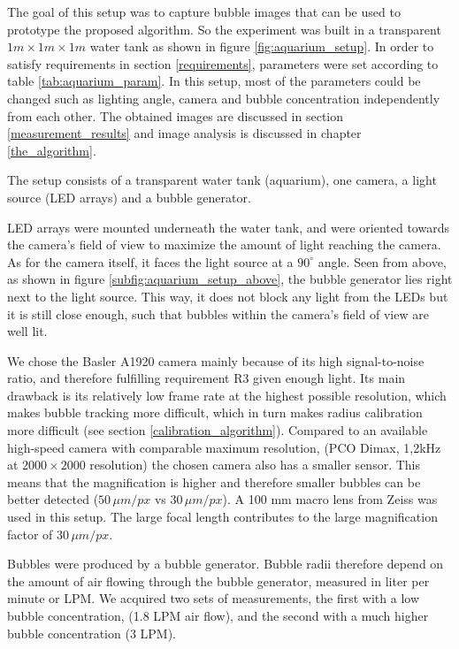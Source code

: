 		The goal of this setup was to capture bubble images that can be used to prototype the proposed algorithm. So the experiment was built in a transparent $1m \times 1m \times 1m$ water tank as shown in figure \ref{fig:aquarium_setup}. In order to satisfy requirements in section \ref{requirements}, parameters were set according to table \ref{tab:aquarium_param}. 
		 In this setup, most of the parameters could be changed such as lighting angle, camera and bubble concentration independently from each other. The obtained images are discussed in section \ref{measurement_results} and image analysis is discussed in chapter \ref{the_algorithm}.
		 
		 The setup consists of a transparent water tank (aquarium), one camera, a light source (LED arrays) and a bubble generator. 
		 
		 LED arrays were mounted underneath the water tank, and were oriented towards the camera's field of view to maximize the amount of light reaching the camera. As for the camera itself, it faces the light source at a $90^\circ$ angle. 
		 Seen from above, as shown in figure \ref{subfig:aquarium_setup_above}, the bubble generator lies right next to the light source. This way, it does not block any light from the LEDs but it is still close enough, such that bubbles within the camera's field of view are well lit. 
		
		We chose the Basler A1920 camera mainly because of its high signal-to-noise ratio, and therefore fulfilling requirement R3 given enough light. Its main drawback is its relatively low frame rate at the highest possible resolution, which makes bubble tracking more difficult, which in turn makes radius calibration more difficult (see section \ref{calibration_algorithm}). Compared to an available high-speed camera with comparable maximum resolution, (PCO Dimax, 1,2kHz at $2000 \times 2000$ resolution) the chosen camera also has a smaller sensor. This means that the magnification is higher and therefore smaller bubbles can be better detected ($50 \, \mu m/px$ vs $30 \, \mu m /px$). A 100 mm macro lens from Zeiss was used in this setup. The large focal length contributes to the large magnification factor of $30 \, \mu m /px$.
	
	Bubbles were produced by a bubble generator. Bubble radii therefore depend on the amount of air flowing through the bubble generator, measured in liter per minute or LPM. We acquired two sets of measurements, the first with a low bubble concentration, (1.8 LPM air flow), and the second with a much higher bubble concentration (3 LPM). 
		
